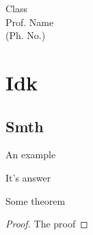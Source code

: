 


	\begin{titlepage}
		\begin{center}
			\Huge{Class}\\
			Prof. Name\\
			(Ph. No.)
		\end{center}
	\end{titlepage}
	\tableofcontents
	\newpage
	\chapter{Idk}
	\section{Smth}
	\begin{eg}
		An example
	\end{eg}
	\begin{explanation}
		It's answer
	\end{explanation}
	\begin{theorem}[Name]
		Some theorem
	\end{theorem}
	\begin{proof}
		The proof
	\end{proof}
